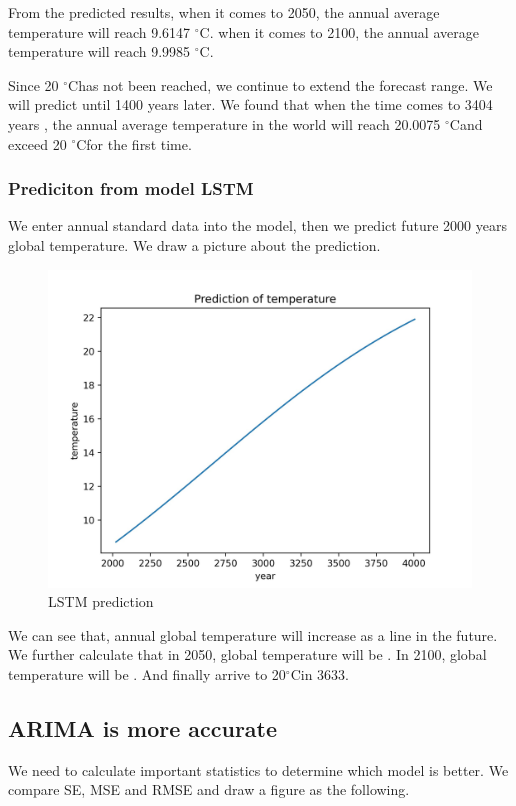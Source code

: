 \documentclass{apmcmthesis}
\def\oc{$^{\circ}$C\;}
\begin{document}
  From the predicted results, when it comes to 2050, the annual average temperature will reach 9.6147 \oc. when it comes to 2100, the annual average temperature will reach 9.9985 \oc.
  
  Since 20 \oc has not been reached, we continue to extend the forecast range. We will predict until 1400 years later. We found that when the time comes to 3404 years , the annual average temperature in the world will reach 20.0075 \oc and exceed 20 \oc for the first time.
  
  \subsubsection{Prediciton from model LSTM}
  
  We enter annual standard data into the model, then we predict future 2000 years global temperature.
  We draw a picture about the prediction.
  
  \begin{figure}[htbp]
    \centering
    \includegraphics[scale=0.15]{LSTM prediction.jpg}
    \caption{LSTM prediction}
  \end{figure}
  
  We can see that, annual global temperature will increase as a line in the future.
  We further calculate that in 2050, global temperature will be .
  In 2100, global temperature will be .
  And finally arrive to 20\oc in 3633.
  
  
  \subsection{ARIMA is more accurate}
  We need to calculate important statistics to determine which model is better. 
  We compare SE, MSE and RMSE and draw a figure as the following.
  
\end{document}

